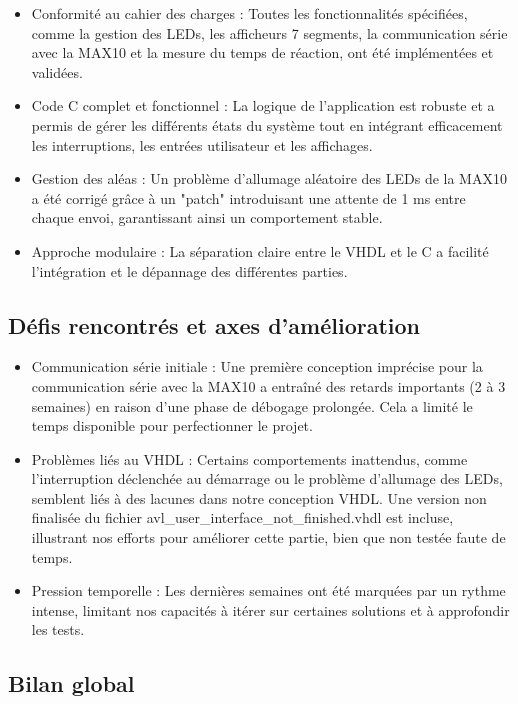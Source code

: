 \documentclass[a4paper,12pt]{article}
\begin{document}
\begin{itemize}
    \item Conformité au cahier des charges : Toutes les fonctionnalités spécifiées, comme la gestion des LEDs, les afficheurs 7 segments, la communication série avec la MAX10 et la mesure du temps de réaction, ont été implémentées et validées.
    \item Code C complet et fonctionnel : La logique de l'application est robuste et a permis de gérer les différents états du système tout en intégrant efficacement les interruptions, les entrées utilisateur et les affichages.
    \item Gestion des aléas : Un problème d'allumage aléatoire des LEDs de la MAX10 a été corrigé grâce à un "patch" introduisant une attente de 1 ms entre chaque envoi, garantissant ainsi un comportement stable.
    \item Approche modulaire : La séparation claire entre le VHDL et le C a facilité l'intégration et le dépannage des différentes parties.
\end{itemize}

\subsection{Défis rencontrés et axes d'amélioration}

\begin{itemize}
    \item Communication série initiale : Une première conception imprécise pour la communication série avec la MAX10 a entraîné des retards importants (2 à 3 semaines) en raison d'une phase de débogage prolongée. Cela a limité le temps disponible pour perfectionner le projet.
    \item Problèmes liés au VHDL : Certains comportements inattendus, comme l'interruption déclenchée au démarrage ou le problème d'allumage des LEDs, semblent liés à des lacunes dans notre conception VHDL. Une version non finalisée du fichier avl\_user\_interface\_not\_finished.vhdl est incluse, illustrant nos efforts pour améliorer cette partie, bien que non testée faute de temps.
    \item Pression temporelle : Les dernières semaines ont été marquées par un rythme intense, limitant nos capacités à itérer sur certaines solutions et à approfondir les tests.
\end{itemize}

\subsection{Bilan global}
\end{document}
